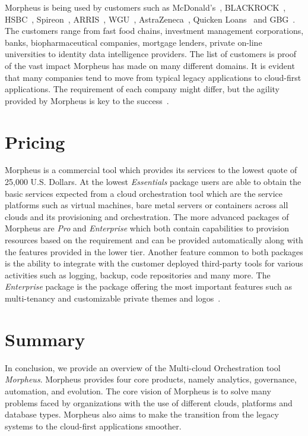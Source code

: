 Morpheus is being used by customers such as 
McDonald's~\cite{hid-sp18-416-www-mcdonalds}, 
BLACKROCK~\cite{hid-sp18-416-www-blackrock}, HSBC~\cite{hid-sp18-416-www-hsbc}, 
Spireon~\cite{hid-sp18-416-www-spireon}, ARRIS~\cite{hid-sp18-416-www-arris}, 
WGU~\cite{hid-sp18-416-www-wgu}, 
AstraZeneca~\cite{hid-sp18-416-www-astrazeneca}, 
Quicken Loans~\cite{hid-sp18-416-www-quickenloans} and 
GBG~\cite{hid-sp18-416-www-gbg}. The customers range from fast food chains, 
investment management corporations, banks, biopharmaceutical companies, 
mortgage lenders, private on-line universities to identity data intelligence 
providers. The list of customers is proof of the vast impact Morpheus has made 
on many different domains. It is evident that many companies tend to move from 
typical legacy applications to cloud-first applications. The requirement of 
each company might differ, but the agility provided by Morpheus is key to the 
success~\cite{hid-sp18-416-www-morpheus-customers}. 

\section{Pricing}
\label{sec:pricing}

Morpheus is a commercial tool which provides its services to the lowest quote 
of 25,000 U.S. Dollars. At the lowest \textit{Essentials} package users are 
able to obtain the basic services expected from a cloud orchestration tool 
which are the service platforms such as virtual machines, bare metal servers or 
containers across all clouds and its provisioning and orchestration. The more 
advanced packages of Morpheus are \textit{Pro} and \textit{Enterprise} which 
both contain capabilities to provision resources based on the requirement and 
can be provided automatically along with the features provided in the lower 
tier. Another feature common to both packages is the ability to integrate with 
the customer deployed third-party tools for various activities such as logging, 
backup, code repositories and many more. The \textit{Enterprise} package is the 
package offering the most important features such as multi-tenancy and 
customizable private themes and logos~\cite{hid-sp18-416-www-morpheus-pricing}. 

\section{Summary}
\label{sec:summary}

In conclusion, we provide an overview of the Multi-cloud Orchestration tool 
\textit{Morpheus}. Morpheus provides four core products, namely analytics, 
governance, automation, and evolution. The core vision of Morpheus is to solve 
many problems faced by organizations with the use of different clouds, 
platforms and database types. Morpheus also aims to make the transition from 
the legacy systems to the cloud-first applications smoother.  
 
